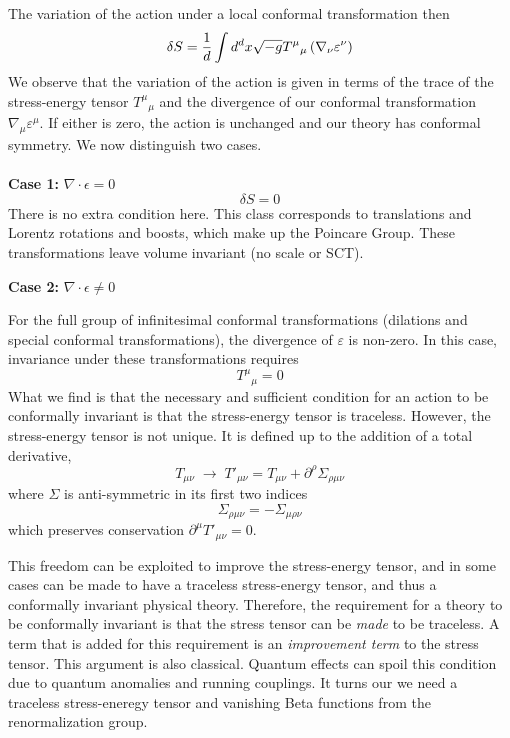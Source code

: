 \documentclass{article}
\begin{document}
The variation of the action under a local conformal transformation then
\begin{equation}
    \delta S = \frac{1}{d}\int d^dx \sqrt{-g}\space T^\mu{}_\mu\left(\nabla_\nu\varepsilon^\nu\right)
\end{equation}
We observe that the variation of the action is given in terms of the trace of the stress-energy tensor $T^\mu{}_\mu$ and the divergence of our conformal transformation $\nabla_\mu\varepsilon^\mu$. If either is zero, the action is unchanged and our theory has conformal symmetry. We now distinguish two cases.\\\\
\textbf{Case 1:} $\nabla \cdot \epsilon = 0$
\begin{equation}
\delta S = 0
\end{equation}
There is no extra condition here. This class corresponds to translations and Lorentz rotations and boosts, which make up the Poincare Group. These transformations leave volume invariant (no scale or SCT).

\textbf{Case 2:} $\nabla \cdot \epsilon \neq 0$

For the full group of infinitesimal conformal transformations (dilations and special conformal transformations), the divergence of $\varepsilon$ is non-zero. In this case, invariance under these transformations requires
\begin{equation}
T^\mu{}_\mu = 0
\end{equation}
What we find is that the necessary and sufficient condition for an action to be
conformally invariant is that the stress-energy tensor is traceless. However, the stress-energy tensor is not unique. It is defined up to the addition of a total derivative,
\begin{equation}
T_{\mu\nu} \;\to\; T'_{\mu\nu}
=
T_{\mu\nu}
+
\partial^\rho \Sigma_{\rho\mu\nu}
\end{equation}
where $\Sigma$ is anti-symmetric in its first two indices
\begin{equation}
\Sigma_{\rho\mu\nu} = - \Sigma_{\mu\rho\nu}
\end{equation}
which preserves conservation \(\partial^\mu T'_{\mu\nu} = 0\).

This freedom can be exploited to improve the stress-energy tensor, and in some cases can be made to have a traceless stress-energy tensor, and thus a conformally invariant physical theory. Therefore, the requirement for a theory to be conformally invariant is that the stress tensor can be \textit{made} to be traceless. A term that is added for this requirement is an \textit{improvement term} to the stress tensor. This argument is also classical. Quantum effects can spoil this condition due to quantum anomalies and running couplings. It turns our we need a traceless stress-eneregy tensor and vanishing Beta functions from the renormalization group. 
\end{document}
